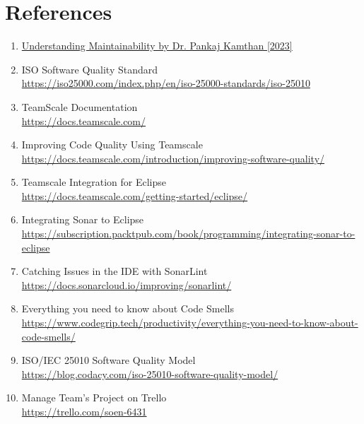 \documentclass[12pt,english]{article}
\begin{document}
\section{References}
\begin{enumerate}
    \item \href{https://users.encs.concordia.ca/~kamthan/courses/soen-6431/understanding_maintainability.pdf}{Understanding Maintainability by Dr. Pankaj Kamthan [2023]}
    \item ISO Software Quality Standard \\ \href{https://iso25000.com/index.php/en/iso-25000-standards/iso-25010}{https://iso25000.com/index.php/en/iso-25000-standards/iso-25010}
    \item TeamScale Documentation \\\href{https://docs.teamscale.com/}{https://docs.teamscale.com/}
    \item Improving Code Quality Using Teamscale \\\href{https://docs.teamscale.com/introduction/improving-software-quality/}{https://docs.teamscale.com/introduction/improving-software-quality/}
    \item Teamscale Integration for Eclipse \\\href{https://docs.teamscale.com/getting-started/eclipse/}{https://docs.teamscale.com/getting-started/eclipse/}
    \item Integrating Sonar to Eclipse \\\href{https://subscription.packtpub.com/book/programming/9781849517867/6/ch06lvl1sec03/integrating-sonar-to-eclipse#:~:text=Launch%20Eclipse%20and%20go%20to,hosted%20at%20the%20preceding%20address.}{https://subscription.packtpub.com/book/programming/integrating-sonar-to-eclipse}
    \item Catching Issues in the IDE with SonarLint \\\href{https://docs.sonarcloud.io/improving/sonarlint/#:~:text=SonarLint%20is%20a%20free%20IDE,the%20code%20is%20even%20committed.}{https://docs.sonarcloud.io/improving/sonarlint/}
    \item Everything you need to know about Code Smells \\ \href{https://www.codegrip.tech/productivity/everything-you-need-to-know-about-code-smells/}{https://www.codegrip.tech/productivity/everything-you-need-to-know-about-code-smells/}
    \item ISO/IEC 25010 Software Quality Model
    \\\href{https://blog.codacy.com/iso-25010-software-quality-model//}{https://blog.codacy.com/iso-25010-software-quality-model/}
    \item Manage Team's Project on Trello \\ \href{https://trello.com/invite/b/7KgMwndv/ATTI48a736897511bb8c57c1553f7b0e772dCBC3EF6B/soen-6431}{https://trello.com/soen-6431}
\end{enumerate}
    
\end{document}
